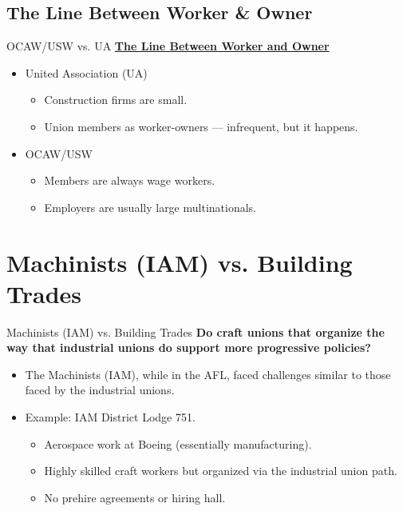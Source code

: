 \documentclass{beamer}
\begin{document}
\subsection*{The Line Between Worker \& Owner}
\begin{frame}{OCAW/USW vs. UA}
\underline{\textbf{The Line Between Worker and Owner}}
	\begin{itemize}
		\item United Association (UA)
		\begin{itemize}
			\item Construction firms are small.
			\item Union members as worker-owners — infrequent, but it happens.
		\end{itemize}
		\item OCAW/USW
			\begin{itemize}
				\item Members are always wage workers.
				\item Employers are usually large multinationals.
			\end{itemize}
	\end{itemize}
\end{frame}


\section{Machinists (IAM) vs. Building Trades}
\begin{frame}{Machinists (IAM) vs. Building Trades}
\textbf{Do craft unions that organize the way that industrial unions do support more progressive policies?}\newline
	\begin{itemize}
		\item The Machinists (IAM), while in the AFL, faced challenges similar to those faced by the industrial unions.
		\item Example: IAM District Lodge 751.
		\begin{itemize}
			\item Aerospace work at Boeing (essentially manufacturing).
			\item Highly skilled craft workers but organized via the industrial union path.
			\item No prehire agreements or hiring hall.
		\end{itemize}
	\end{itemize}
\end{frame}
\end{document}
